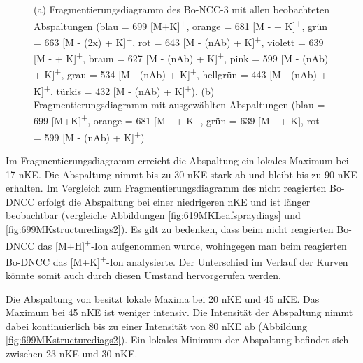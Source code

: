 \begin{figure}[!htbp]
  \caption[Fragmentierungsdiagramme des Reaktionsproduktes von Bo-DNCC, Quelle: Autor]{(a) Fragmentierungsdiagramm des Bo-NCC-3 mit allen beobachteten Abspaltungen (blau = 699 [M+K]\textsuperscript{+}, orange = 681 [M -  + K]\textsuperscript{+}, grün = 663 [M - (2x) + K]\textsuperscript{+}, rot = 643 [M - (\gls{nAb}) + K]\textsuperscript{+}, violett = 639 [M -  + K]\textsuperscript{+}, braun = 627 [M - (\gls{nAb}) + K]\textsuperscript{+}, pink = 599 [M - (\gls{nAb}) + K]\textsuperscript{+}, grau = 534 [M - (\gls{nAb}) + K]\textsuperscript{+}, hellgrün = 443 [M - (\gls{nAb}) + K]\textsuperscript{+}, türkis = 432 [M - (\gls{nAb}) + K]\textsuperscript{+}), (b) Fragmentierungsdiagramm mit ausgewählten Abspaltungen (blau = 699 [M+K]\textsuperscript{+}, orange = 681 [M -  + K -, grün = 639 [M -  + K], rot = 599 [M - (\gls{nAb}) + K]\textsuperscript{+})}
\end{figure} 

Im Fragmentierungsdiagramm erreicht die  Abspaltung ein lokales Maximum bei 17 \gls{nKE}. Die Abspaltung nimmt bis zu 30 \gls{nKE} stark ab und bleibt bis zu 90 \gls{nKE} erhalten. Im Vergleich zum Fragmentierungsdiagramm des nicht reagierten Bo-DNCC erfolgt die  Abspaltung bei einer niedrigeren \gls{nKE} und ist länger beobachtbar (vergleiche Abbildungen \ref{fig:619MKLeafspraydiags} und \ref{fig:699MKstructurediags2}). Es gilt zu bedenken, dass beim nicht reagierten Bo-DNCC das [M+H]\textsuperscript{+}-Ion aufgenommen wurde, wohingegen man beim reagierten Bo-DNCC das [M+K]\textsuperscript{+}-Ion analysierte. Der Unterschied im Verlauf der Kurven könnte somit auch durch diesen Umstand hervorgerufen werden.

Die Abspaltung von  besitzt lokale Maxima bei 20 \gls{nKE} und 45 \gls{nKE}. Das Maximum bei 45 \gls{nKE} ist weniger intensiv. Die Intensität der Abspaltung nimmt dabei kontinuierlich bis zu einer Intensität von 80 \gls{nKE} ab (Abbildung \ref{fig:699MKstructurediags2}). Ein lokales Minimum der Abspaltung befindet sich zwischen 23 \gls{nKE} und 30 \gls{nKE}. \\



